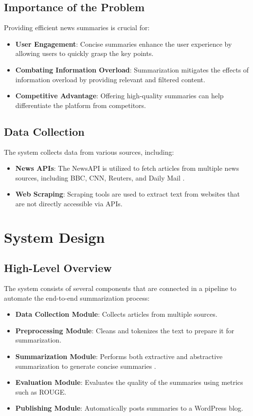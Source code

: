 \documentclass[12pt]{article}
\begin{document}
\subsection{Importance of the Problem}
Providing efficient news summaries is crucial for:
\begin{itemize}
    \item \textbf{User Engagement}: Concise summaries enhance the user experience by allowing users to quickly grasp the key points.
    \item \textbf{Combating Information Overload}: Summarization mitigates the effects of information overload by providing relevant and filtered content.
    \item \textbf{Competitive Advantage}: Offering high-quality summaries can help differentiate the platform from competitors.
\end{itemize}

\subsection{Data Collection}
The system collects data from various sources, including:
\begin{itemize}
    \item \textbf{News APIs}: The NewsAPI is utilized to fetch articles from multiple news sources, including BBC, CNN, Reuters, and Daily Mail \citep{newsapi}.
    \item \textbf{Web Scraping}: Scraping tools are used to extract text from websites that are not directly accessible via APIs.
\end{itemize}

\section{System Design}
\subsection{High-Level Overview}
The system consists of several components that are connected in a pipeline to automate the end-to-end summarization process:
\begin{itemize}
    \item \textbf{Data Collection Module}: Collects articles from multiple sources.
    \item \textbf{Preprocessing Module}: Cleans and tokenizes the text to prepare it for summarization.
    \item \textbf{Summarization Module}: Performs both extractive and abstractive summarization to generate concise summaries \citep{raffel2020exploring}.
    \item \textbf{Evaluation Module}: Evaluates the quality of the summaries using metrics such as ROUGE.
    \item \textbf{Publishing Module}: Automatically posts summaries to a WordPress blog.
\end{itemize}
\end{document}
